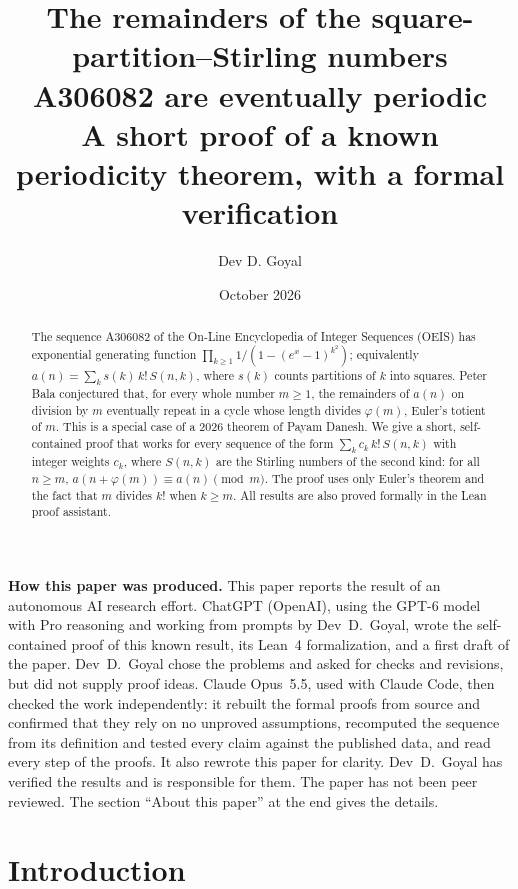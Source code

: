 \documentclass[11pt,a4paper]{article}
\title{The remainders of the square-partition--Stirling numbers A306082 are eventually periodic\\[6pt]\large A short proof of a known periodicity theorem, with a formal verification}
\author{Dev D. Goyal}
\date{October 2026}
\theoremstyle{definition}
\theoremstyle{remark}
\begin{document}
\maketitle
\begin{abstract}
The sequence A306082 of the On-Line Encyclopedia of Integer Sequences (OEIS) has exponential generating function $\prod_{k\ge1}1/(1-(e^x-1)^{k^2})$; equivalently $a(n)=\sum_ks(k)\,k!\,S(n,k)$, where $s(k)$ counts partitions of $k$ into squares. Peter Bala conjectured that, for every whole number $m\ge1$, the remainders of $a(n)$ on
division by $m$ eventually repeat in a cycle whose length divides $\varphi(m)$, Euler's totient of $m$. This is a special
case of a 2026 theorem of Payam Danesh. We give a short, self-contained proof that works for every sequence of the form
$\sum_k c_k\,k!\,S(n,k)$ with integer weights $c_k$, where $S(n,k)$ are the Stirling numbers of the second kind: for all
$n\ge m$, $a(n+\varphi(m))\equiv a(n)\pmod m$. The proof uses only Euler's theorem and the fact that $m$ divides $k!$
when $k\ge m$. All results are also proved formally in the Lean proof assistant.
\end{abstract}
\begin{center}\begin{minipage}{0.88\linewidth}\small
\textbf{How this paper was produced.} This paper reports the result of an autonomous AI research effort.
ChatGPT (OpenAI), using the GPT-6 model with Pro reasoning and working from prompts by Dev~D.~Goyal, wrote the self-contained proof of this known result, its Lean~4 formalization, and a first draft of the paper.
Dev~D.~Goyal chose the problems and asked for checks and revisions, but did not supply proof ideas.
Claude Opus~5.5, used with Claude Code, then checked the work independently: it rebuilt the formal proofs from
source and confirmed that they rely on no unproved assumptions, recomputed the sequence from its definition and tested
every claim against the published data, and read every step of the proofs. It also rewrote this paper for clarity.
Dev~D.~Goyal has verified the results and is responsible for them. The paper has not been peer reviewed.
The section ``About this paper'' at the end gives the details.
\end{minipage}\end{center}

\section{Introduction}
\end{document}
